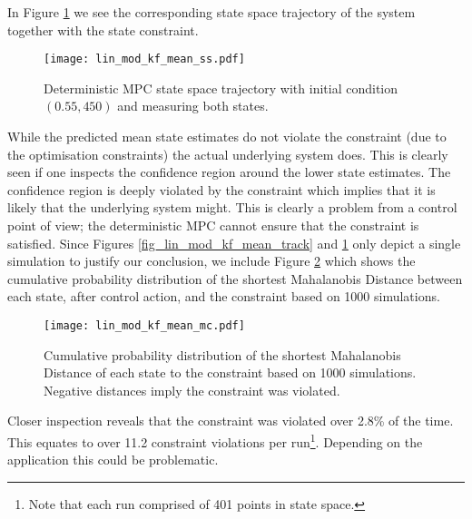 In Figure \ref{fig_lin_mod_kf_mean_ss} we see the corresponding state space trajectory of the system together with the state constraint.
\begin{figure}[H]
\centering
\texttt{[image: lin\_mod\_kf\_mean\_ss.pdf]}
\caption{Deterministic MPC state space trajectory with initial condition $(0.55, 450)$ and measuring both states.}
\label{fig_lin_mod_kf_mean_ss}
\end{figure}
While the predicted mean state estimates do not violate the constraint (due to the optimisation constraints) the actual underlying system does.  This is clearly seen if one inspects the confidence region around the lower state estimates. The confidence region is deeply violated by the constraint which implies that it is likely that the underlying system might. This is clearly a problem from a control point of view; the deterministic MPC cannot ensure that the constraint is satisfied. Since Figures \ref{fig_lin_mod_kf_mean_track} and \ref{fig_lin_mod_kf_mean_ss} only depict a single simulation to justify our conclusion, we include Figure \ref{fig_lin_mod_kf_mean_mc} which shows the cumulative probability distribution of the shortest Mahalanobis Distance between each state, after control action, and the constraint based on 1000 simulations.
\begin{figure}[H]
\centering
\texttt{[image: lin\_mod\_kf\_mean\_mc.pdf]}
\caption{Cumulative probability distribution of the shortest Mahalanobis Distance of each state to the constraint based on 1000 simulations. Negative distances imply the constraint was violated.}
\label{fig_lin_mod_kf_mean_mc}
\end{figure}
Closer inspection reveals that the constraint was violated over 2.8\% of the time. This equates to over 11.2 constraint violations per run\footnote{Note that each run comprised of 401 points in state space.}. Depending on the application this could be problematic.

